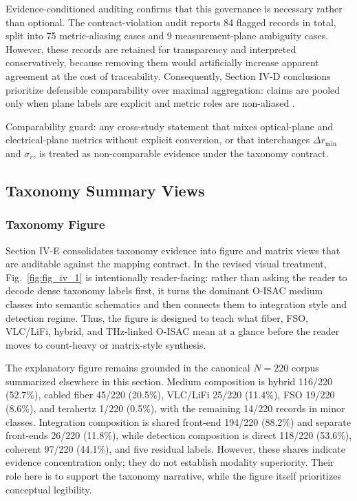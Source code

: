 \documentclass[lettersize,journal]{IEEEtran}
\begin{document}
Evidence-conditioned auditing confirms that this governance is necessary rather than optional. The contract-violation audit reports 84 flagged records in total, split into 75 metric-aliasing cases and 9 measurement-plane ambiguity cases. However, these records are retained for transparency and interpreted conservatively, because removing them would artificially increase apparent agreement at the cost of traceability. Consequently, Section IV-D conclusions prioritize defensible comparability over maximal aggregation: claims are pooled only when plane labels are explicit and metric roles are non-aliased \cite{O_ISAC_132,O_ISAC_061,O_ISAC_013,O_ISAC_050,O_ISAC_056}.

Comparability guard: any cross-study statement that mixes optical-plane and electrical-plane metrics without explicit conversion, or that interchanges $\Delta r_{\min}$ and $\sigma_r$, is treated as non-comparable evidence under the taxonomy contract.

\subsection{Taxonomy Summary Views}

\subsubsection{Taxonomy Figure}
Section IV-E consolidates taxonomy evidence into figure and matrix views that are auditable against the mapping contract. In the revised visual treatment, Fig.~\ref{fig:fig_iv_1} is intentionally reader-facing: rather than asking the reader to decode dense taxonomy labels first, it turns the dominant O-ISAC medium classes into semantic schematics and then connects them to integration style and detection regime. Thus, the figure is designed to teach what fiber, FSO, VLC/LiFi, hybrid, and THz-linked O-ISAC mean at a glance before the reader moves to count-heavy or matrix-style synthesis.

The explanatory figure remains grounded in the canonical $N=220$ corpus summarized elsewhere in this section. Medium composition is hybrid 116/220 (52.7\%), cabled fiber 45/220 (20.5\%), VLC/LiFi 25/220 (11.4\%), FSO 19/220 (8.6\%), and terahertz 1/220 (0.5\%), with the remaining 14/220 records in minor classes. Integration composition is shared front-end 194/220 (88.2\%) and separate front-ends 26/220 (11.8\%), while detection composition is direct 118/220 (53.6\%), coherent 97/220 (44.1\%), and five residual labels. However, these shares indicate evidence concentration only; they do not establish modality superiority. Their role here is to support the taxonomy narrative, while the figure itself prioritizes conceptual legibility.
\end{document}
